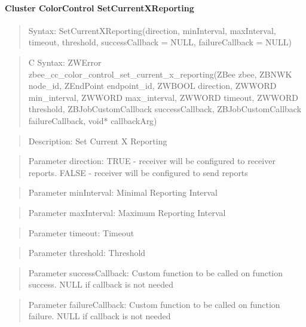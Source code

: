 \paragraph{Cluster ColorControl SetCurrentXReporting}
\begin{quote}Syntax: SetCurrentXReporting(direction, minInterval, maxInterval, timeout, threshold, successCallback = NULL, failureCallback = NULL)\end{quote}
\begin{quote}C Syntax: ZWError zbee\_cc\_color\_control\_set\_current\_x\_reporting(ZBee zbee, ZBNWK node\_id, ZEndPoint endpoint\_id, ZWBOOL direction, ZWWORD min\_interval, ZWWORD max\_interval, ZWWORD timeout, ZWWORD threshold, ZBJobCustomCallback successCallback, ZBJobCustomCallback failureCallback, void* callbackArg)\end{quote}
\begin{quote}Description: Set Current X Reporting\end{quote}
\begin{quote}Parameter direction: TRUE  - receiver will be configured to receiver reports. FALSE - receiver will be configured to send reports\end{quote}
\begin{quote}Parameter minInterval: Minimal Reporting Interval\end{quote}
\begin{quote}Parameter maxInterval: Maximum Reporting Interval\end{quote}
\begin{quote}Parameter timeout: Timeout\end{quote}
\begin{quote}Parameter threshold: Threshold\end{quote}
\begin{quote}Parameter successCallback: Custom function to be called on function success. NULL if callback is not needed\end{quote}
\begin{quote}Parameter failureCallback: Custom function to be called on function failure. NULL if callback is not needed\end{quote}


